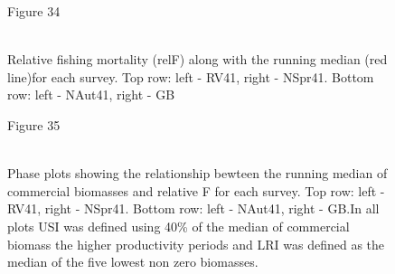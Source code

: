 \documentclass[11pt]{article}
\newcommand{\e}{/SpinDr/backup/bio_data/bio.lobster/figures/} %
\begin{document}
\begin{figure}
\centering
        {Figure 34}\\
       \\

       \caption{Relative fishing mortality (relF) along with the running median (red line)for each survey. Top row: left - RV41, right - NSpr41. Bottom row: left - NAut41, right - GB }
\end{figure}
     \clearpage


\begin{landscape}
\begin{figure}
\centering
        {Figure 35}\\
        \\

       
       \caption{Phase plots showing the relationship bewteen the running median of commercial biomasses and relative F for each survey. Top row: left - RV41, right - NSpr41. Bottom row: left - NAut41, right - GB.In all plots USI was defined using 40\% of the median of commercial biomass the higher productivity periods and LRI was defined as the median of the five lowest non zero biomasses. }

\end{figure}
\end{landscape}

\clearpage

\end{document}
